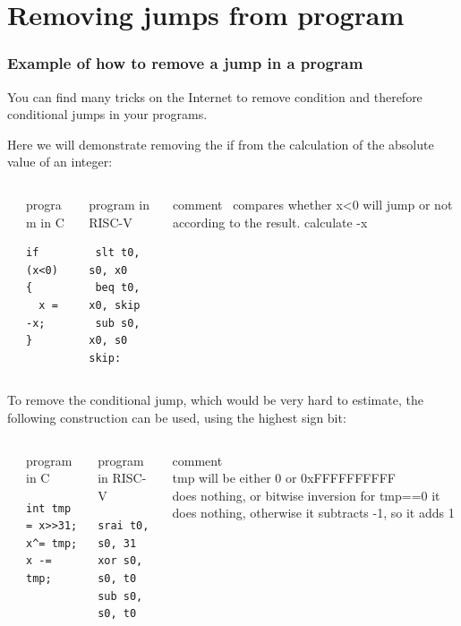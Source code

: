 \documentclass{beamer}
\begin{document}
\section{Removing jumps from program}

\begin{frame}[fragile]
\frametitle{Example of how to remove a jump in a program}

You can find many tricks on the Internet to remove condition and therefore conditional jumps in your programs.

Here we will demonstrate removing the if from the calculation of the absolute value of an integer:

\begin{columns}[T]
\begin{column}{0.01\textwidth}
\phantom{x}
\end{column}
\begin{column}{0.25\textwidth}
program in C
\begin{verbatim}
if (x<0) {
  x = -x;
}
\end{verbatim}
\end{column}

\begin{column}{0.28\textwidth}
program in RISC-V
\begin{verbatim}
 slt t0, s0, x0
 beq t0, x0, skip
 sub s0, x0, s0
skip:
\end{verbatim}
\end{column}
\begin{column}{0.45\textwidth}
\phantom{x}comment\
\small
compares whether x<0
will jump or not according to the result.
calculate -x
\end{column}
\end{columns}
\bigskip

To remove the conditional jump, which would be very hard to estimate, the following construction can be used, using the highest sign bit:
\begin{columns}[T]
\begin{column}{0.01\textwidth}
\phantom{x}
\end{column}
\begin{column}{0.25\textwidth}
program in C
\begin{verbatim}
int tmp = x>>31;
x^= tmp;
x -= tmp;
\end{verbatim}
\end{column}

\begin{column}{0.28\textwidth}
program in RISC-V
\begin{verbatim}
srai t0, s0, 31
xor s0, s0, t0
sub s0, s0, t0
\end{verbatim}
\end{column}
\begin{column}{0.45\textwidth}
\phantom{x}comment\\
\small
tmp will be either 0 or 0xFFFFFFFFFF\\
does nothing, or bitwise inversion
for tmp==0 it does nothing, otherwise it subtracts -1, so it adds 1
\end{column}
\end{columns}
\end{frame}
\end{document}
